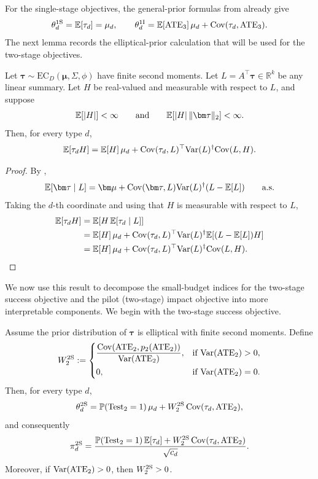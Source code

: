 For the single-stage objectives, the general-prior formulas from  already give
\[
  \theta_d^{\mathrm{1S}}=\mathbb{E}[\tau_d]=\mu_d,
  \qquad
  \theta_d^{\mathrm{1I}}
  =
  \mathbb{E}[\mathrm{ATE}_3] \, \mu_d+{\rm Cov}(\tau_d,\mathrm{ATE}_3).
\]
The next lemma records the elliptical-prior calculation that will be used for the two-stage objectives.

\begin{lemma}
  \label{lem:elliptical-weighted-linear-summary-appendix}
  Let \(\bm\tau\sim\mathrm{EC}_D(\bm\mu,\Sigma,\phi)\) have finite second moments.
  Let \(L=A^\top\bm\tau\in\mathbb R^k\) be any linear summary.
  Let \(H\) be real-valued and measurable with respect to \(L\), and suppose
  \[
    \E[|H|]<\infty
    \qquad\text{and}\qquad
    \E[|H|\,\|\bm\tau\|_2]<\infty .
  \]
  Then, for every type \(d\),
  \[
    \mathbb{E}[\tau_d H]
    =
    \mathbb{E}[H]\,\mu_d
    +
    {\rm Cov}(\tau_d,L)^\top{\rm Var}(L)^\dagger{\rm Cov}(L,H).
  \]
\end{lemma}

\begin{proof}
  By ,
  \[
    \E[\bm\tau\mid L]
    =
    \bm\mu
    +
    \cov(\bm\tau,L)\var(L)^\dagger(L-\E[L])
    \qquad\text{a.s.}
  \]
  Taking the \(d\)-th coordinate and using that \(H\) is measurable with
  respect to \(L\),
  \[
    \begin{aligned}
      \mathbb{E}[\tau_d H]
      &=
      \mathbb{E}\!\left[H\,\mathbb{E}[\tau_d\mid L]\right] \\
      &=
      \mathbb{E}[H]\,\mu_d
      +
      {\rm Cov}(\tau_d,L)^\top{\rm Var}(L)^\dagger
      \mathbb{E}\!\left[(L-\mathbb{E}[L])H\right] \\
      &=
      \mathbb{E}[H]\,\mu_d
      +
      {\rm Cov}(\tau_d,L)^\top{\rm Var}(L)^\dagger{\rm Cov}(L,H).
    \end{aligned}
  \]
\end{proof}

We now use this result to decompose the small-budget indices for the two-stage success objective and the pilot (two-stage) impact objective into more interpretable components.
We begin with the two-stage success objective.

\begin{proposition}
  \label{prop:two-stage-success-elliptical-appendix}
  Assume the prior distribution of \(\bm\tau\) is elliptical with finite second moments.
  Define
  \[
    W_2^{\mathrm{2S}}
    :=
    \begin{cases}
      \dfrac{{\rm Cov}(\mathrm{ATE}_2,p_2(\mathrm{ATE}_2))}{{\rm Var}(\mathrm{ATE}_2)}, & \text{if }{\rm Var}(\mathrm{ATE}_2)>0,\\[8pt]
      0, & \text{if }{\rm Var}(\mathrm{ATE}_2)=0.
    \end{cases}
  \]
  Then, for every type \(d\),
  \[
    \theta_d^{\mathrm{2S}}
    =
    \mathbb{P}(\operatorname{Test}_2=1)\,\mu_d
    +
    W_2^{\mathrm{2S}}\,{\rm Cov}(\tau_d,\mathrm{ATE}_2),
  \]
  and consequently
  \[
    \pi_d^{\mathrm{2S}}
    =
    \frac{
      \mathbb{P}(\operatorname{Test}_2=1)\,\mathbb{E}[\tau_d]
      +
      W_2^{\mathrm{2S}}\,{\rm Cov}(\tau_d,\mathrm{ATE}_2)
    }{\sqrt{c_d}}.
  \]
  Moreover, if \({\rm Var}(\mathrm{ATE}_2)>0\), then \(W_2^{\mathrm{2S}}>0\).
\end{proposition}

